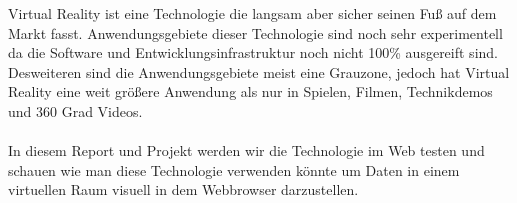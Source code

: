 
Virtual Reality ist eine Technologie die langsam aber sicher seinen Fuß auf dem Markt fasst. Anwendungsgebiete dieser Technologie sind
noch sehr experimentell da die Software und Entwicklungsinfrastruktur noch nicht 100\% ausgereift sind. \\ 
Desweiteren sind die Anwendungsgebiete meist eine Grauzone, jedoch hat Virtual Reality eine weit größere Anwendung als nur in Spielen,
Filmen, Technikdemos und 360 Grad Videos. \\ \\
In diesem Report und Projekt werden wir die Technologie im Web testen und schauen wie man diese Technologie verwenden könnte um Daten in
einem virtuellen Raum visuell in dem Webbrowser darzustellen.

